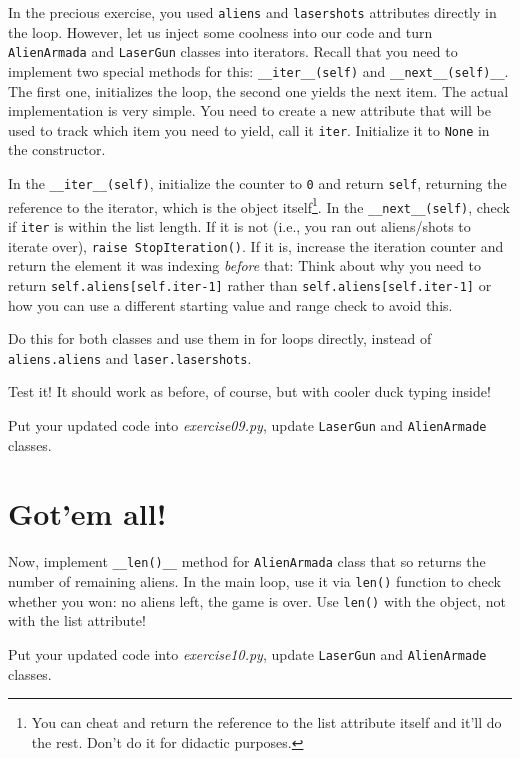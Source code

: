 \documentclass[
]{book}
\begin{document}
In the precious exercise, you used \texttt{aliens} and \texttt{lasershots} attributes directly in the loop. However, let us inject some coolness into our code and turn \texttt{AlienArmada} and \texttt{LaserGun} classes into iterators. Recall that you need to implement two special methods for this: \texttt{\_\_iter\_\_(self)} and \texttt{\_\_next\_\_(self)\_\_}. The first one, initializes the loop, the second one yields the next item. The actual implementation is very simple. You need to create a new attribute that will be used to track which item you need to yield, call it \texttt{iter}. Initialize it to \texttt{None} in the constructor.

In the \texttt{\_\_iter\_\_(self)}, initialize the counter to \texttt{0} and return \texttt{self}, returning the reference to the iterator, which is the object itself\footnote{You can cheat and return the reference to the list attribute itself and it'll do the rest. Don't do it for didactic purposes.}. In the \texttt{\_\_next\_\_(self)}, check if \texttt{iter} is within the list length. If it is not (i.e., you ran out aliens/shots to iterate over), \texttt{raise\ StopIteration()}. If it is, increase the iteration counter and return the element it was indexing \emph{before} that: Think about why you need to return \texttt{self.aliens{[}self.iter-1{]}} rather than \texttt{self.aliens{[}self.iter-1{]}} or how you can use a different starting value and range check to avoid this.

Do this for both classes and use them in for loops directly, instead of \texttt{aliens.aliens} and \texttt{laser.lasershots}.

Test it! It should work as before, of course, but with cooler duck typing inside!

Put your updated code into \emph{exercise09.py}, update \texttt{LaserGun} and \texttt{AlienArmade} classes.

\hypertarget{gotem-all}{%
\section{Got'em all!}\label{gotem-all}}

Now, implement \texttt{\_\_len()\_\_} method for \texttt{AlienArmada} class that so returns the number of remaining aliens. In the main loop, use it via \texttt{len()} function to check whether you won: no aliens left, the game is over. Use \texttt{len()} with the object, not with the list attribute!

Put your updated code into \emph{exercise10.py}, update \texttt{LaserGun} and \texttt{AlienArmade} classes.
\end{document}
